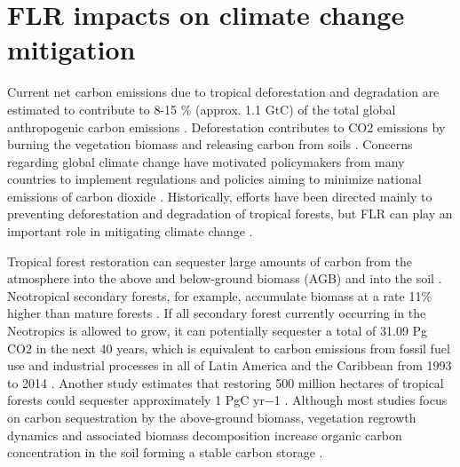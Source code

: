 


\chapter{FLR impacts on climate change mitigation} \label{ch:carbon}


Current net carbon emissions due to tropical deforestation and degradation are estimated to contribute to 8-15 \% (approx. 1.1 GtC) of the total global anthropogenic carbon emissions \citep{Houghton2015ACO2, Brinck2017HighCycle}. Deforestation contributes to CO2 emissions by burning the vegetation biomass and releasing carbon from soils \citep{Wang2016DynamicsChina}. Concerns regarding global climate change have motivated policymakers from many countries to implement regulations and policies aiming to minimize national emissions of carbon dioxide \citep{Stavins1997PolicyProblem, Clarkson2015TheScheme}. Historically, efforts have been directed mainly to preventing deforestation and degradation of tropical forests, but FLR can play an important role in mitigating climate change \citep{Chazdon2016c,Locatelli2015TropicalCarbon}. 

Tropical forest restoration can sequester large amounts of carbon from the atmosphere into the above and below-ground biomass (AGB) and into the soil \citep{Silver2000TheLands, Lal2004SoilSecurity, Cunningham2015BalancingRegions}. Neotropical secondary forests, for example, accumulate biomass at a rate 11\% higher than mature forests \citep{Poorter2016}. If all secondary forest currently occurring in the Neotropics is allowed to grow, it can potentially sequester a total of 31.09 Pg CO2 in the next 40 years, which is equivalent to carbon emissions from fossil fuel use and industrial processes in all of Latin America and the Caribbean from 1993 to 2014 \citep{Chazdon2016c}. Another study estimates that restoring 500 million hectares of tropical forests could sequester approximately 1 PgC yr−1 \citep{Houghton2015ACO2}. Although most studies focus on carbon sequestration by the above-ground biomass, vegetation regrowth dynamics and associated biomass decomposition increase organic carbon concentration in the soil forming a stable carbon storage \citep{Xu2018EffectsChina}. 

